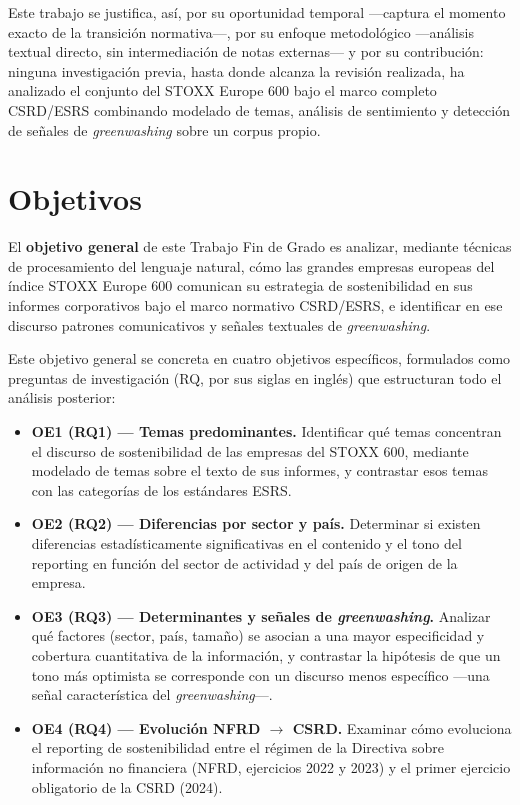 \bigskip
Este trabajo se justifica, así, por su oportunidad temporal —captura el momento
exacto de la transición normativa—, por su enfoque metodológico —análisis textual directo,
sin intermediación de notas externas— y por su contribución: ninguna investigación previa,
hasta donde alcanza la revisión realizada, ha analizado el conjunto del STOXX Europe 600 bajo
el marco completo CSRD/ESRS combinando modelado de temas, análisis de sentimiento y detección
de señales de \textit{greenwashing} sobre un corpus propio.

\section{Objetivos}
\label{sec:objetivos}

El \textbf{objetivo general} de este Trabajo Fin de Grado es analizar, mediante técnicas de
procesamiento del lenguaje natural, cómo las grandes empresas europeas del índice STOXX
Europe 600 comunican su estrategia de sostenibilidad en sus informes corporativos bajo el
marco normativo CSRD/ESRS, e identificar en ese discurso patrones comunicativos y señales
textuales de \textit{greenwashing}.

Este objetivo general se concreta en cuatro objetivos específicos, formulados como preguntas
de investigación (RQ, por sus siglas en inglés) que estructuran todo el análisis posterior:

\begin{itemize}
  \item \textbf{OE1 (RQ1) — Temas predominantes.} Identificar qué temas concentran el
  discurso de sostenibilidad de las empresas del STOXX 600, mediante modelado de temas sobre
  el texto de sus informes, y contrastar esos temas con las categorías de los estándares
  ESRS.
  \item \textbf{OE2 (RQ2) — Diferencias por sector y país.} Determinar si existen diferencias
  estadísticamente significativas en el contenido y el tono del reporting en función del
  sector de actividad y del país de origen de la empresa.
  \item \textbf{OE3 (RQ3) — Determinantes y señales de \textit{greenwashing}.} Analizar qué
  factores (sector, país, tamaño) se asocian a una mayor especificidad y cobertura
  cuantitativa de la información, y contrastar la hipótesis de que un tono más optimista se
  corresponde con un discurso menos específico —una señal característica del
  \textit{greenwashing}—.
  \item \textbf{OE4 (RQ4) — Evolución NFRD $\rightarrow$ CSRD.} Examinar cómo evoluciona el
  reporting de sostenibilidad entre el régimen de la Directiva sobre información no financiera
  (NFRD, ejercicios 2022 y 2023) y el primer ejercicio obligatorio de la CSRD (2024).
\end{itemize}

